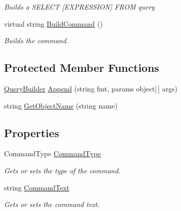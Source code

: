 \begin{DoxyCompactItemize}
\begin{DoxyCompactList}\small\item\em Builds a S\+E\+L\+E\+C\+T \mbox{[}E\+X\+P\+R\+E\+S\+S\+I\+O\+N\mbox{]} F\+R\+O\+M query \end{DoxyCompactList}\item 
virtual string \hyperlink{class_o_t_a_1_1_data_1_1_query_builder_a85dda77485547f935fdcc4de5990b965}{Build\+Command} ()
\begin{DoxyCompactList}\small\item\em Builds the command. \end{DoxyCompactList}\end{DoxyCompactItemize}
\subsection*{Protected Member Functions}
\begin{DoxyCompactItemize}
\item 
\hyperlink{class_o_t_a_1_1_data_1_1_query_builder}{Query\+Builder} \hyperlink{class_o_t_a_1_1_data_1_1_query_builder_a251cdb35c0e2c846646c928b77b32a0b}{Append} (string fmt, params object\mbox{[}$\,$\mbox{]} args)
\item 
string \hyperlink{class_o_t_a_1_1_data_1_1_query_builder_a4c501d8a236d587c8ff477fa775bfec7}{Get\+Object\+Name} (string name)
\end{DoxyCompactItemize}
\subsection*{Properties}
\begin{DoxyCompactItemize}
\item 
Command\+Type \hyperlink{class_o_t_a_1_1_data_1_1_query_builder_a8ccaa717afcb77ce6fcd6694f8282727}{Command\+Type}
\begin{DoxyCompactList}\small\item\em Gets or sets the type of the command. \end{DoxyCompactList}\item 
string \hyperlink{class_o_t_a_1_1_data_1_1_query_builder_a1eadb38554f8f97ae346e4d7c3517d82}{Command\+Text}
\begin{DoxyCompactList}\small\item\em Gets or sets the command text. \end{DoxyCompactList}\end{DoxyCompactItemize}



